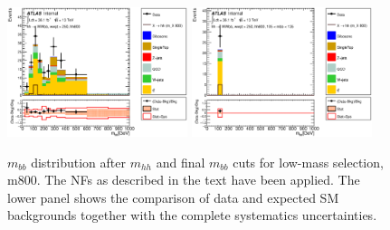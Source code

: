 \begin{figure}[!h]
\begin{center}
\includegraphics*[width=0.47\textwidth] {figures/Unblinded_mbb/C_reOpt700_mww_bbpt210_wwpt250_hh800_bbMass_regionA_met25d020.eps}
\includegraphics*[width=0.47\textwidth] {figures/Unblinded_mbb/C_reOpt700_mww_bbpt210_wwpt250_hh800_mbb_bbMass_regionA_met25d020.eps}
\caption[$m_{bb}$ distribution after $m_{hh}$ and final $m_{bb}$ cuts for low-mass selection, m800.]{$m_{bb}$ distribution after $m_{hh}$ and final $m_{bb}$ cuts for low-mass selection, m800. The NFs as described in the text have been applied. The lower panel shows the comparison of data and expected SM backgrounds together with the complete systematics uncertainties.}
\end{center}
\end{figure}
\clearpage

